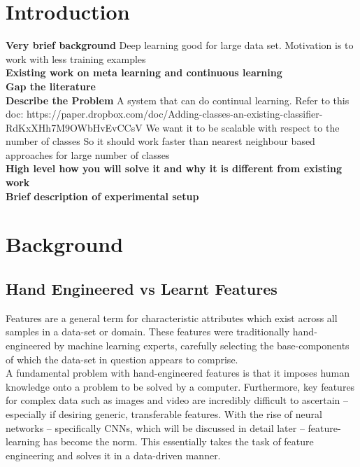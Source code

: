 \documentclass{report}
\title{}
\author{Ash}
\begin{document}
	
	\maketitle
	\thispagestyle{empty}
	\newpage
	\thispagestyle{empty}
	\tableofcontents
	\newpage
	\thispagestyle{empty}
	\listoffigures
	\newpage
	
	\chapter{Introduction}
	\textbf{Very brief background}
	Deep learning good for large data set.
	Motivation is to work with less training examples \\
	\textbf{Existing work on meta learning and continuous learning} \\
	\textbf{Gap the literature} \\
	\textbf{Describe the Problem}
	A system that can do continual learning. Refer to this doc:
	https://paper.dropbox.com/doc/Adding-classes-an-existing-classifier-RdKxXHh7M9OWbHvEvCCsV
	We want it to be scalable with respect to the number of classes
	So it should work faster than nearest neighbour based approaches for large number of classes \\
	\textbf{High level how you will solve it and why it is different from existing work} \\
	\textbf{Brief description of experimental setup} \\
	
	\chapter{Background}
	\section{Hand Engineered vs Learnt Features}
	Features are a general term for characteristic attributes which exist across all samples in a data-set or domain. These features were traditionally hand-engineered by machine learning experts, carefully selecting the base-components of which the data-set in question appears to comprise. \\
	A fundamental problem with hand-engineered features is that it imposes human knowledge onto a problem to be solved by a computer. Furthermore, key features for complex data such as images and video are incredibly difficult to ascertain -- especially if desiring generic, transferable features. With the rise of neural networks -- specifically CNNs, which will be discussed in detail later -- feature-learning has become the norm. This essentially takes the task of feature engineering and solves it in a data-driven manner.
\end{document}
